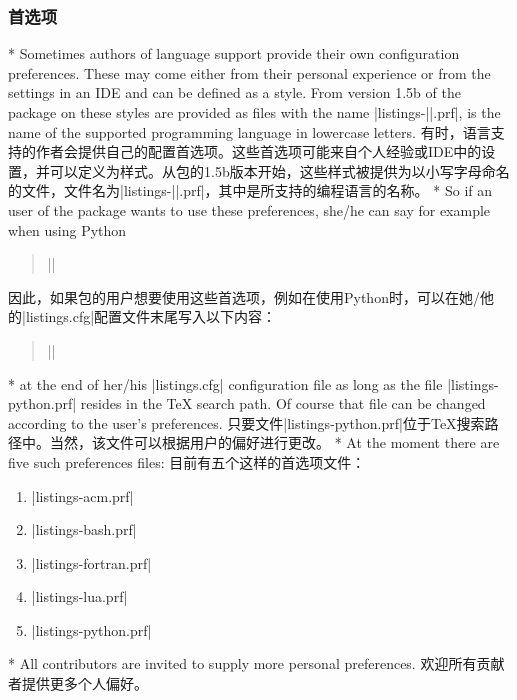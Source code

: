 \begin{paracol}{2}
\subsubsection{首选项}
\switchcolumn[0]*%
Sometimes authors of language support provide their own configuration
preferences. These may come either from their personal experience or
from the settings in an IDE and can be defined as a 
style. From version 1.5b of the  package on these
styles are provided as files with the name
|listings-||.prf|,  is the name of the
supported programming language in lowercase letters.
\switchcolumn
有时，语言支持的作者会提供自己的配置首选项。这些首选项可能来自个人经验或IDE中的设置，并可以定义为样式。从包的1.5b版本开始，这些样式被提供为以小写字母命名的文件，文件名为|listings-||.prf|，其中是所支持的编程语言的名称。
\switchcolumn[0]*%
So if an user of the  package wants to use these
preferences, she/he can say for example when using Python
\begin{quote}
    ||
\end{quote}
\switchcolumn
因此，如果包的用户想要使用这些首选项，例如在使用Python时，可以在她/他的|listings.cfg|配置文件末尾写入以下内容：
\begin{quote}
||
\end{quote}
\switchcolumn[0]*%
at the end of her/his |listings.cfg| configuration file as long as the
file |listings-python.prf| resides in the \TeX{} search path. Of course
that file can be changed according to the user's preferences.
\switchcolumn
只要文件|listings-python.prf|位于\TeX{}搜索路径中。当然，该文件可以根据用户的偏好进行更改。
\switchcolumn[0]*%
At the moment there are five such preferences files:
\switchcolumn
目前有五个这样的首选项文件：
\begin{enumerate}
  \item |listings-acm.prf|
  \item |listings-bash.prf|
  \item |listings-fortran.prf|
  \item |listings-lua.prf|
  \item |listings-python.prf|
\end{enumerate}
\switchcolumn[0]*%
All contributors are invited to supply more personal preferences.
\switchcolumn
欢迎所有贡献者提供更多个人偏好。
\end{paracol}